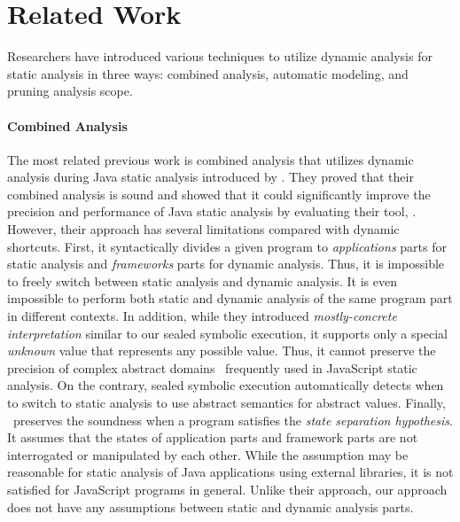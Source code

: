 \section{Related Work}\label{sec:related}
Researchers have introduced various techniques to utilize dynamic
analysis for static analysis in three ways: combined analysis,
automatic modeling, and pruning analysis scope.


\paragraph{Combined Analysis}
The most related previous work is combined analysis that utilizes dynamic
analysis during Java static analysis introduced by \citet{concerto}.
They proved that their combined analysis is sound and showed that it could
significantly improve the precision and performance of Java static analysis by
evaluating their tool, \concerto.  However, their approach has several
limitations compared with dynamic shortcuts.  First, it syntactically
divides a given program to \textit{applications} parts for static
analysis and \textit{frameworks} parts for dynamic analysis.  Thus, it is impossible to
freely switch between static analysis and dynamic analysis.  It is
even impossible to perform both static and dynamic analysis of 
the same program part in different contexts.  In addition, while they
introduced \textit{mostly-concrete interpretation} similar to our
sealed symbolic execution, it supports only a special \textit{unknown}
value that represents any possible value.  Thus, it cannot preserve
the precision of complex abstract domains~\cite{revisit-recency,
  regex, weaklySPE} frequently used in JavaScript static analysis.
On the contrary, sealed symbolic execution automatically detects when
to switch to static analysis to use abstract semantics for abstract values.
Finally, \concerto\ preserves the soundness when a program satisfies
the \textit{state separation hypothesis}.  It assumes that the states
of application parts and framework parts are not interrogated
or manipulated by each other.  While the assumption may be reasonable
for static analysis of Java applications using external libraries, it
is not satisfied for JavaScript programs in general.  Unlike their
approach, our approach does not have any assumptions between static and
dynamic analysis parts.


